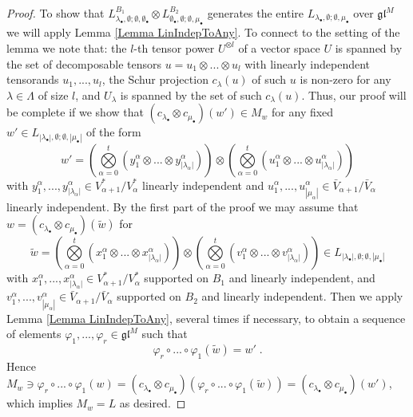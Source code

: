 \documentclass[12pt]{article}
\def\mk {\mathfrak}
\begin{document}
\begin{proof}
To show that $L^{B_1}_{\lambda_\bullet,\emptyset;\emptyset,\emptyset_\bullet} \otimes L^{B_2}_{\emptyset_\bullet,\emptyset;\emptyset,\mu_\bullet}$ generates the entire $L_{\lambda_\bullet,\emptyset;\emptyset,\mu_\bullet}$ over $\mk{gl}^M$ we will apply Lemma \ref{Lemma LinIndepToAny}. To connect to the setting of the lemma we note that: the $l$-th tensor power $U^{\otimes l}$ of a vector space $U$ is spanned by the set of decomposable tensors $u=u_1\otimes ...\otimes u_l$ with linearly independent tensorands $u_1,...,u_l$, the Schur projection $c_\lambda(u)$ of such $u$ is non-zero for any $\lambda\in\Lambda$ of size $l$, and $U_\lambda$ is spanned by the set of such $c_\lambda(u)$. Thus, our proof will be complete if we show that $(c_{\lambda_\bullet}\otimes c_{\mu_\bullet})(w')\in M_w$ for any fixed $w'\in L_{|\lambda_\bullet|,\emptyset;\emptyset,|\mu_\bullet|}$ of the form
$$
w' = \left( \bigotimes\limits_{\alpha=0}^t (y^\alpha_1\otimes...\otimes y^\alpha_{|\lambda_\alpha|}) \right) \otimes \left( \bigotimes\limits_{\alpha=0}^t (u^\alpha_1\otimes...\otimes u^\alpha_{|\lambda_\alpha|}) \right)
$$
with $y^\alpha_1,..., y^\alpha_{|\lambda_\alpha|}\in V^*_{\alpha+1}/V^*_\alpha$ linearly independent and $u^\alpha_1,..., u^\alpha_{|\mu_\alpha|}\in \bar V_{\alpha+1}/\bar V_\alpha$ linearly independent. By the first part of the proof we may assume that $w=(c_{\lambda_\bullet} \otimes c_{\mu_\bullet})(\tilde w)$ for
$$
\tilde w = \left( \bigotimes\limits_{\alpha=0}^t (x^\alpha_1\otimes...\otimes x^\alpha_{|\lambda_\alpha|}) \right) \otimes \left( \bigotimes\limits_{\alpha=0}^t (v^\alpha_1\otimes...\otimes v^\alpha_{|\lambda_\alpha|}) \right) \in L_{|\lambda_\bullet|,\emptyset;\emptyset,|\mu_\bullet|}
$$
with $x^\alpha_1,..., x^\alpha_{|\lambda_\alpha|}\in V^*_{\alpha+1}/V^*_\alpha$ supported on $B_1$ and linearly independent, and $v^\alpha_1,..., v^\alpha_{|\mu_\alpha|}\in \bar V_{\alpha+1}/\bar V_\alpha$ supported on $B_2$ and linearly independent. Then we apply Lemma \ref{Lemma LinIndepToAny}, several times if necessary, to obtain a sequence of elements $\varphi_1,...,\varphi_r\in\mk{gl}^M$ such that
$$
\varphi_r\circ...\circ \varphi_1 (\tilde w) = w' \;.
$$
Hence $M_w\ni \varphi_r\circ...\circ \varphi_1(w)=(c_{\lambda_\bullet} \otimes c_{\mu_\bullet})(\varphi_r\circ...\circ \varphi_1(\tilde w))= (c_{\lambda_\bullet} \otimes c_{\mu_\bullet})(w')$, which implies $M_w=L$ as desired.
\end{proof}
\end{document}
